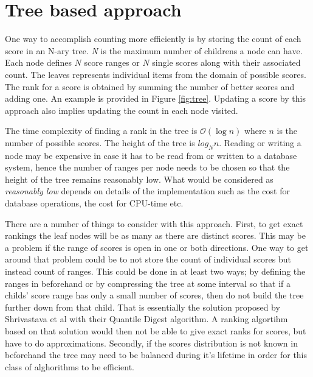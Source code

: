 \section{\label{sec:tree}Tree based approach}

One way to accomplish counting more efficiently is by storing the count of each score in an N-ary tree. \emph{N} is the maximum number of childrens a node can have. Each node defines $N$ score ranges or $N$ single scores along with their associated count. The leaves represents individual items from the domain of possible scores. The rank for a score is obtained by summing the number of better scores and adding one. An example is provided in Figure \ref{fig:tree}. Updating a score by this approach also implies updating the count in each node visited.

The time complexity of finding a rank in the tree is $\mathcal{O}(\log{} n)$ where $n$ is the number of possible scores. The height of the tree is $log_{N}n$. Reading or writing a node may be expensive in case it has to be read from or written to a database system, hence the number of ranges per node needs to be chosen so that the height of the tree remains reasonably low. What would be considered as \emph{reasonably low} depends on details of the implementation such as the cost for database operations, the cost for CPU-time etc. 

There are a number of things to consider with this approach. First, to get exact rankings the leaf nodes will be as many as there are distinct scores. This may be a problem if the range of scores is open in one or both directions. One way to get around that problem could be to not store the count of individual scores but instead count of ranges. This could be done in at least two ways; by defining the ranges in beforehand or by compressing the tree at some interval so that if a childs' score range has only a small number of scores, then do not build the tree further down from that child. That is essentially the solution proposed by Shrivastava et al\cite{quantile_digest} with their Quantile Digest algorithm. A ranking algortihm based on that solution would then not be able to give exact ranks for scores, but have to do approximations. Secondly, if the scores distribution is not known in beforehand the tree may need to be balanced during it's lifetime in order for this class of alghorithms to be efficient.

